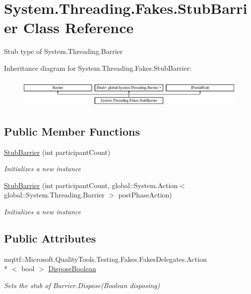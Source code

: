 \hypertarget{class_system_1_1_threading_1_1_fakes_1_1_stub_barrier}{\section{System.\-Threading.\-Fakes.\-Stub\-Barrier Class Reference}
\label{class_system_1_1_threading_1_1_fakes_1_1_stub_barrier}
}


Stub type of System.\-Threading.\-Barrier 


Inheritance diagram for System.\-Threading.\-Fakes.\-Stub\-Barrier\-:\begin{figure}[H]
\begin{center}
\leavevmode
\includegraphics[height=1.464052cm]{class_system_1_1_threading_1_1_fakes_1_1_stub_barrier}
\end{center}
\end{figure}
\subsection*{Public Member Functions}
\begin{DoxyCompactItemize}
\item 
\hyperlink{class_system_1_1_threading_1_1_fakes_1_1_stub_barrier_a7672c361eab55be71fccd03c4f739053}{Stub\-Barrier} (int participant\-Count)
\begin{DoxyCompactList}\small\item\em Initializes a new instance\end{DoxyCompactList}\item 
\hyperlink{class_system_1_1_threading_1_1_fakes_1_1_stub_barrier_aaffc98ff938fef718be79249caf59f2d}{Stub\-Barrier} (int participant\-Count, global\-::\-System.\-Action$<$ global\-::\-System.\-Threading.\-Barrier $>$ post\-Phase\-Action)
\begin{DoxyCompactList}\small\item\em Initializes a new instance\end{DoxyCompactList}\end{DoxyCompactItemize}
\subsection*{Public Attributes}
\begin{DoxyCompactItemize}
\item 
mqttf\-::\-Microsoft.\-Quality\-Tools.\-Testing.\-Fakes.\-Fakes\-Delegates.\-Action\\*
$<$ bool $>$ \hyperlink{class_system_1_1_threading_1_1_fakes_1_1_stub_barrier_a5061fbf58c124e5902dd58e31b330db5}{Dispose\-Boolean}
\begin{DoxyCompactList}\small\item\em Sets the stub of Barrier.\-Dispose(\-Boolean disposing)\end{DoxyCompactList}\end{DoxyCompactItemize}
